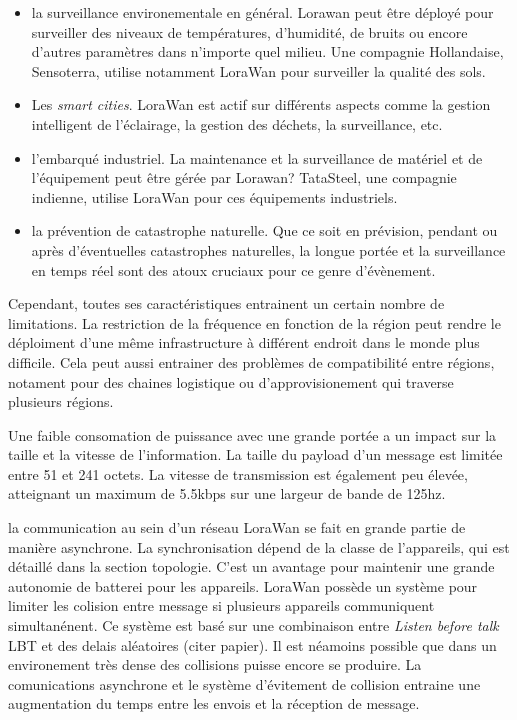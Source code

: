 \begin{itemize}

\item la surveillance environementale en général. Lorawan peut être déployé pour surveiller des niveaux de températures, d'humidité, de bruits ou encore d'autres paramètres dans n'importe quel milieu. Une compagnie Hollandaise, Sensoterra, utilise notamment LoraWan pour surveiller la qualité des sols.
\item Les \textit{smart cities}. LoraWan est actif sur différents aspects comme la gestion intelligent de l'éclairage, la gestion des déchets, la surveillance, etc.
\item l'embarqué industriel. La maintenance et la surveillance de matériel et de l'équipement peut être gérée par Lorawan? TataSteel, une compagnie indienne, utilise LoraWan pour ces équipements industriels.
\item la prévention de catastrophe naturelle. Que ce soit en prévision, pendant ou après d'éventuelles catastrophes naturelles, la longue portée et la surveillance en temps réel sont des atoux cruciaux pour ce genre d'évènement.
\end{itemize}

\vspace{0.1cm}

Cependant, toutes ses caractéristiques entrainent un certain nombre de limitations. La restriction de la fréquence en fonction de la région peut rendre le déploiment d'une même infrastructure à différent endroit dans le monde plus difficile. Cela peut aussi entrainer des problèmes de compatibilité entre régions, notament pour des chaines logistique ou d'approvisionement qui traverse plusieurs régions.

\vspace{0.1cm}

Une faible consomation de puissance avec une grande portée a un impact sur la taille et la vitesse de l'information. La taille du payload d'un message est limitée entre 51 et 241 octets. La vitesse de transmission est également peu élevée, atteignant un maximum de 5.5kbps sur une largeur de bande de 125hz.

\vspace{0.1cm}

la communication au sein d'un réseau LoraWan se fait en grande partie de manière asynchrone. La synchronisation dépend de la classe de l'appareils, qui est détaillé dans la section topologie. C'est un avantage pour maintenir une grande autonomie de batterei pour les appareils. LoraWan possède un système pour limiter les colision entre message si plusieurs appareils communiquent simultanénent. Ce système est basé sur une combinaison entre \textit{Listen before talk} LBT et des delais aléatoires (citer papier). Il est néamoins possible que dans un environement très dense des collisions puisse encore se produire. La comunications asynchrone et le système d'évitement de collision entraine une augmentation du temps entre les envois et la réception de message.

